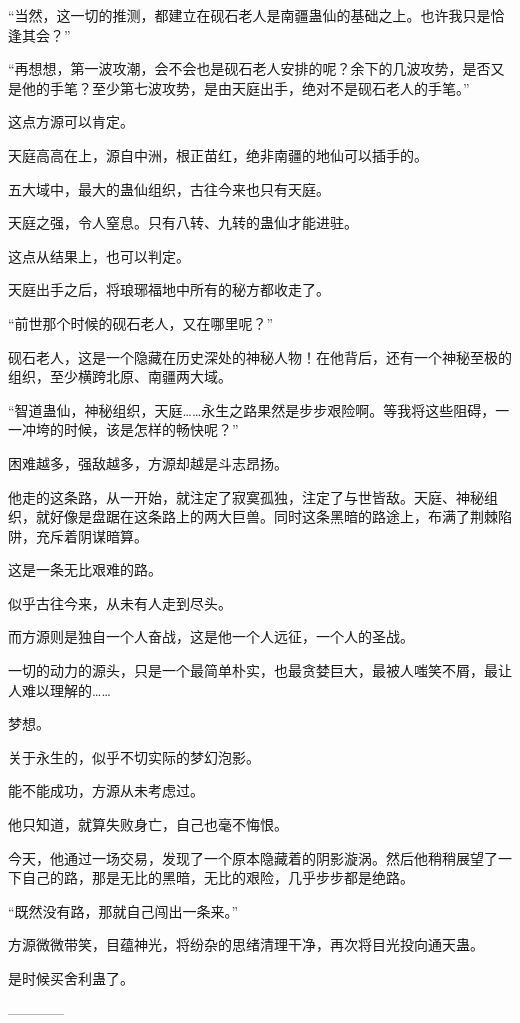 \begin{this_body}
“当然，这一切的推测，都建立在砚石老人是南疆蛊仙的基础之上。也许我只是恰逢其会？”

“再想想，第一波攻潮，会不会也是砚石老人安排的呢？余下的几波攻势，是否又是他的手笔？至少第七波攻势，是由天庭出手，绝对不是砚石老人的手笔。”

这点方源可以肯定。

天庭高高在上，源自中洲，根正苗红，绝非南疆的地仙可以插手的。

五大域中，最大的蛊仙组织，古往今来也只有天庭。

天庭之强，令人窒息。只有八转、九转的蛊仙才能进驻。

这点从结果上，也可以判定。

天庭出手之后，将琅琊福地中所有的秘方都收走了。

“前世那个时候的砚石老人，又在哪里呢？”

砚石老人，这是一个隐藏在历史深处的神秘人物！在他背后，还有一个神秘至极的组织，至少横跨北原、南疆两大域。

“智道蛊仙，神秘组织，天庭……永生之路果然是步步艰险啊。等我将这些阻碍，一一冲垮的时候，该是怎样的畅快呢？”

困难越多，强敌越多，方源却越是斗志昂扬。

他走的这条路，从一开始，就注定了寂寞孤独，注定了与世皆敌。天庭、神秘组织，就好像是盘踞在这条路上的两大巨兽。同时这条黑暗的路途上，布满了荆棘陷阱，充斥着阴谋暗算。

这是一条无比艰难的路。

似乎古往今来，从未有人走到尽头。

而方源则是独自一个人奋战，这是他一个人远征，一个人的圣战。

一切的动力的源头，只是一个最简单朴实，也最贪婪巨大，最被人嗤笑不屑，最让人难以理解的……

梦想。

关于永生的，似乎不切实际的梦幻泡影。

能不能成功，方源从未考虑过。

他只知道，就算失败身亡，自己也毫不悔恨。

今天，他通过一场交易，发现了一个原本隐藏着的阴影漩涡。然后他稍稍展望了一下自己的路，那是无比的黑暗，无比的艰险，几乎步步都是绝路。

“既然没有路，那就自己闯出一条来。”

方源微微带笑，目蕴神光，将纷杂的思绪清理干净，再次将目光投向通天蛊。

是时候买舍利蛊了。

------------

\end{this_body}

